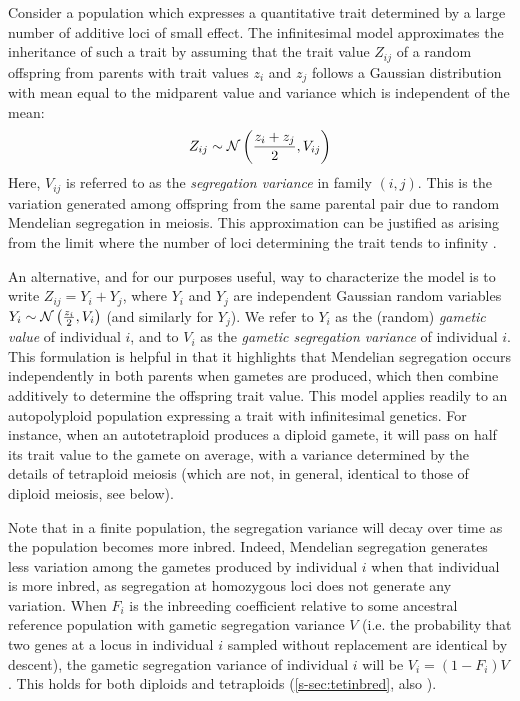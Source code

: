 \documentclass[12pt,a4paper]{article}
\begin{document}
Consider a population which expresses a quantitative trait determined by a
large number of additive loci of small effect.
The infinitesimal model approximates the inheritance of such a trait by
assuming that the trait value $Z_{ij}$ of a random offspring from parents with
trait values $z_i$ and $z_j$ follows a Gaussian distribution with mean equal to
the midparent value and variance which is independent of the mean:
  \begin{align}
  Z_{ij} \sim \mathcal{N}\left(\frac{z_i + z_j}{2}, V_{ij}\right)
  \label{eq:inf}
  \end{align}
Here, $V_{ij}$ is referred to as the \textit{segregation variance} in family
$(i,j)$.
This is the variation generated among offspring from the same parental pair due
to random Mendelian segregation in meiosis.
This approximation can be justified as arising from the limit where the number
of loci determining the trait tends to infinity \citep{barton2017}.

An alternative, and for our purposes useful, way to characterize the model
is to write $Z_{ij} = Y_i + Y_j$, where $Y_i$ and $Y_j$
are independent Gaussian random variables $Y_i \sim \mathcal{N}\left(\frac{z_i}{2},
V_i\right)$ (and similarly for $Y_j$).
We refer to $Y_i$ as the (random) \textit{gametic value} of individual $i$, and
to $V_i$ as the \textit{gametic segregation variance} of individual $i$.
This formulation is helpful in that it highlights that Mendelian segregation
occurs independently in both parents when gametes are produced, which then
combine additively to determine the offspring trait value.
This model applies readily to an autopolyploid population expressing a trait
with infinitesimal genetics.
For instance, when an autotetraploid produces a diploid gamete, it will pass on
half its trait value to the gamete on average, with a variance determined by
the details of tetraploid meiosis (which are not, in general, identical to
those of diploid meiosis, see below).

Note that in a finite population, the segregation variance will decay over time
as the population becomes more inbred.
Indeed, Mendelian segregation generates less variation among the gametes
produced by individual $i$ when that individual is more inbred, as segregation
at homozygous loci does not generate any variation.
When $F_i$ is the inbreeding coefficient relative to some ancestral reference
population with gametic segregation variance $V$ (i.e. the probability that two
genes at a locus in individual $i$ sampled without replacement are identical by
descent), the gametic segregation variance of individual $i$ will be
$V_i = (1-F_i)V$.
This holds for both diploids and tetraploids (\cref{s-sec:tetinbred}, also
\cite{moody1993}). 
\end{document}
